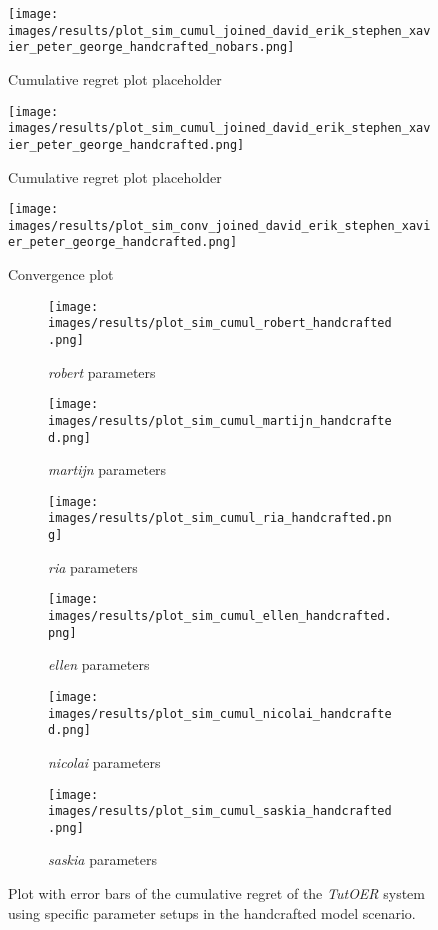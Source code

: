 \begin{figure}[ht]
	\centering
	\texttt{[image: images/results/plot\_sim\_cumul\_joined\_david\_erik\_stephen\_xavier\_peter\_george\_handcrafted\_nobars.png]}
	\caption{Cumulative regret plot placeholder}
	\label{fig:cumul_nobars_placeholder1}
\end{figure}
\begin{figure}[ht]
	\centering
	\texttt{[image: images/results/plot\_sim\_cumul\_joined\_david\_erik\_stephen\_xavier\_peter\_george\_handcrafted.png]}
	\caption{Cumulative regret plot placeholder}
	\label{fig:cumul_placeholder1}
\end{figure}
\begin{figure}[ht]
	\centering
	\texttt{[image: images/results/plot\_sim\_conv\_joined\_david\_erik\_stephen\_xavier\_peter\_george\_handcrafted.png]}
	\caption{Convergence plot}
	\label{fig:conv_placeholder1}
\end{figure}


\begin{figure}[ht]
	\begin{subfigure}{0.48\linewidth}
	\centering
	\texttt{[image: images/results/plot\_sim\_cumul\_robert\_handcrafted.png]}
	\caption{\emph{robert} parameters}
	\label{fig:cumul_handcrafted_robert}
	\end{subfigure}
	\hfill
	\begin{subfigure}{0.48\linewidth}
	\centering
	\texttt{[image: images/results/plot\_sim\_cumul\_martijn\_handcrafted.png]}
	\caption{\emph{martijn} parameters}
	\label{fig:cumul_handcrafted_martijn}
	\end{subfigure}
	\begin{subfigure}{0.48\linewidth}
	\centering
	\texttt{[image: images/results/plot\_sim\_cumul\_ria\_handcrafted.png]}
	\caption{\emph{ria} parameters}
	\label{fig:cumul_handcrafted_ria}
	\end{subfigure}
	\hfill
	\begin{subfigure}{0.48\linewidth}
	\centering
	\texttt{[image: images/results/plot\_sim\_cumul\_ellen\_handcrafted.png]}
	\caption{\emph{ellen} parameters}
	\label{fig:cumul_handcrafted_ellen}
	\end{subfigure}
	\begin{subfigure}{0.48\linewidth}
	\centering
	\texttt{[image: images/results/plot\_sim\_cumul\_nicolai\_handcrafted.png]}
	\caption{\emph{nicolai} parameters}
	\label{fig:cumul_handcrafted_nicolai}
	\end{subfigure}
	\hfill
	\begin{subfigure}{0.48\linewidth}
	\centering
	\texttt{[image: images/results/plot\_sim\_cumul\_saskia\_handcrafted.png]}
	\caption{\emph{saskia} parameters}
	\label{fig:cumul_handcrafted_saskia}
	\end{subfigure}
	\label{fig:cumul_handcrafted_individuals2}
	\caption{Plot with error bars of the cumulative regret of the \emph{TutOER}
	system using specific parameter setups in the handcrafted model
	scenario.}
\end{figure}

